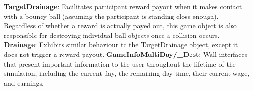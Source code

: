\documentclass{article}
\begin{document}
\textbf{TargetDrainage}: Facilitates participant reward payout when it makes contact with a bouncy ball (assuming the participant is standing close enough). Regardless of whether a reward is actually payed out, this game object is also responsible for destroying individual ball objects once a collision occurs. \newline \newline
\textbf{Drainage}: Exhibits similar behaviour to the TargetDrainage object, except it does not trigger a reward payout. \newline \newline
\textbf{GameInfoMultiDay\slash \_Dest}: Wall interfaces that present important information to the user throughout the lifetime of the simulation, including the current day, the remaining day time, their current wage, and earnings.
\end{document}

